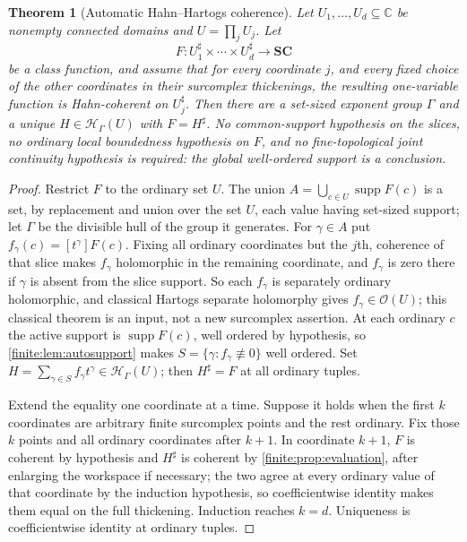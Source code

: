 \documentclass[11pt,letterpaper]{article}
\newtheorem{theorem}{Theorem}[section]
\theoremstyle{definition}
\theoremstyle{remark}
\newcommand{\SC}{\mathbf{SC}}
\newcommand{\C}{\mathbb C}
\newcommand{\OO}{\mathcal O}
\newcommand{\HH}{\mathscr H}
\newcommand{\sh}{^{\sharp}}
\DeclareMathOperator{\supp}{supp}
\numberwithin{equation}{section}
\begin{document}
\begin{theorem}[Automatic Hahn--Hartogs coherence]
\label{finite:thm:hartogs}
Let $U_1,\ldots,U_d\subseteq\C$ be nonempty connected domains and $U=\prod_jU_j$. Let
\[
 F:U_1\sh\times\cdots\times U_d\sh\longrightarrow\SC
\]
be a class function, and assume that for every coordinate $j$, and every fixed choice of the other coordinates in their \emph{surcomplex} thickenings, the resulting one-variable function is Hahn-coherent on $U_j\sh$. Then there are a set-sized exponent group $\Gamma$ and a unique $H\in\HH_\Gamma(U)$ with $F=H\sh$. No common-support hypothesis on the slices, no ordinary local boundedness hypothesis on $F$, and no fine-topological joint continuity hypothesis is required: the global well-ordered support is a \emph{conclusion}.
\end{theorem}

\begin{proof}
Restrict $F$ to the ordinary set $U$. The union $A=\bigcup_{c\in U}\supp F(c)$ is a set, by replacement and union over the set $U$, each value having set-sized support; let $\Gamma$ be the divisible hull of the group it generates. For $\gamma\in A$ put $f_\gamma(c)=[t^\gamma]F(c)$. Fixing all ordinary coordinates but the $j$th, coherence of that slice makes $f_\gamma$ holomorphic in the remaining coordinate, and $f_\gamma$ is zero there if $\gamma$ is absent from the slice support. So each $f_\gamma$ is separately ordinary holomorphic, and classical Hartogs separate holomorphy \cite{finite:BK} gives $f_\gamma\in\OO(U)$; this classical theorem is an input, not a new surcomplex assertion. At each ordinary $c$ the active support is $\supp F(c)$, well ordered by hypothesis, so \cref{finite:lem:autosupport} makes $S=\{\gamma:f_\gamma\not\equiv0\}$ well ordered. Set $H=\sum_{\gamma\in S}f_\gamma t^\gamma\in\HH_\Gamma(U)$; then $H\sh=F$ at all ordinary tuples.

Extend the equality one coordinate at a time. Suppose it holds when the first $k$ coordinates are arbitrary finite surcomplex points and the rest ordinary. Fix those $k$ points and all ordinary coordinates after $k+1$. In coordinate $k+1$, $F$ is coherent by hypothesis and $H\sh$ is coherent by \cref{finite:prop:evaluation}, after enlarging the workspace if necessary; the two agree at every ordinary value of that coordinate by the induction hypothesis, so coefficientwise identity makes them equal on the full thickening. Induction reaches $k=d$. Uniqueness is coefficientwise identity at ordinary tuples.
\end{proof}
\end{document}
